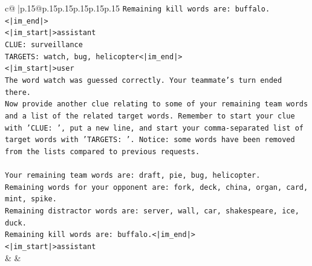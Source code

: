 \documentclass{article}
\begin{document}
{\begin{supertabular}{c@{$\;$}|p{.15\linewidth}@{}p{.15\linewidth}p{.15\linewidth}p{.15\linewidth}p{.15\linewidth}p{.15\linewidth}}
{{{\texttt{Remaining kill words are: buffalo.<|im\_end|>} \\
\texttt{<|im\_start|>assistant} \\
\texttt{CLUE: surveillance} \\
\texttt{TARGETS: watch, bug, helicopter<|im\_end|>} \\
\texttt{<|im\_start|>user} \\
\texttt{The word watch was guessed correctly. Your teammate's turn ended there.} \\
\texttt{Now provide another clue relating to some of your remaining team words and a list of the related target words. Remember to start your clue with 'CLUE: ', put a new line, and start your comma{-}separated list of target words with 'TARGETS: '. Notice: some words have been removed from the lists compared to previous requests.} \\
\\ 
\texttt{Your remaining team words are: draft, pie, bug, helicopter.} \\
\texttt{Remaining words for your opponent are: fork, deck, china, organ, card, mint, spike.} \\
\texttt{Remaining distractor words are: server, wall, car, shakespeare, ice, duck.} \\
\texttt{Remaining kill words are: buffalo.<|im\_end|>} \\
\texttt{<|im\_start|>assistant} \\
            }
        }
    }
    & & \\ \\


\end{supertabular}}
\end{document}
